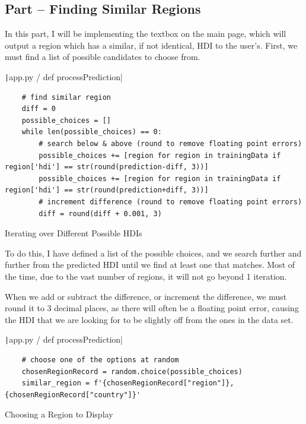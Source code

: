 \documentclass[12pt]{report}
\newcommand{\pil}[1]{\protect\texttt|#1|}
\begin{document}
\subsection{Part \theparts{} -- Finding Similar Regions}

In this part, I will be implementing the textbox on the main page, which will output a region which has a similar, if not identical, HDI to the user's. First, we must find a list of possible candidates to choose from.

\begin{listing}[H]
\pil{app.py / def processPrediction}
\begin{verbatim}
    # find similar region
    diff = 0
    possible_choices = []
    while len(possible_choices) == 0:
        # search below & above (round to remove floating point errors)
        possible_choices += [region for region in trainingData if region['hdi'] == str(round(prediction-diff, 3))]
        possible_choices += [region for region in trainingData if region['hdi'] == str(round(prediction+diff, 3))]
        # increment difference (round to remove floating point errors)
        diff = round(diff + 0.001, 3)
\end{verbatim}
\caption{Iterating over Different Possible HDIs}\label{cs:findPossibleRegions}
\end{listing}

To do this, I have defined a list of the possible choices, and we search further and further from the predicted HDI until we find at least one that matches. Most of the time, due to the vast number of regions, it will not go beyond 1 iteration.

When we add or subtract the difference, or increment the difference, we must round it to 3 decimal places, as there will often be a floating point error, causing the HDI that we are looking for to be slightly off from the ones in the data set.

\begin{listing}[H]
\pil{app.py / def processPrediction}
\begin{verbatim}
    # choose one of the options at random
    chosenRegionRecord = random.choice(possible_choices)
    similar_region = f'{chosenRegionRecord["region"]}, {chosenRegionRecord["country"]}'
\end{verbatim}
\caption{Choosing a Region to Display}\label{cs:chooseRandomRegion}
\end{listing}
\end{document}
